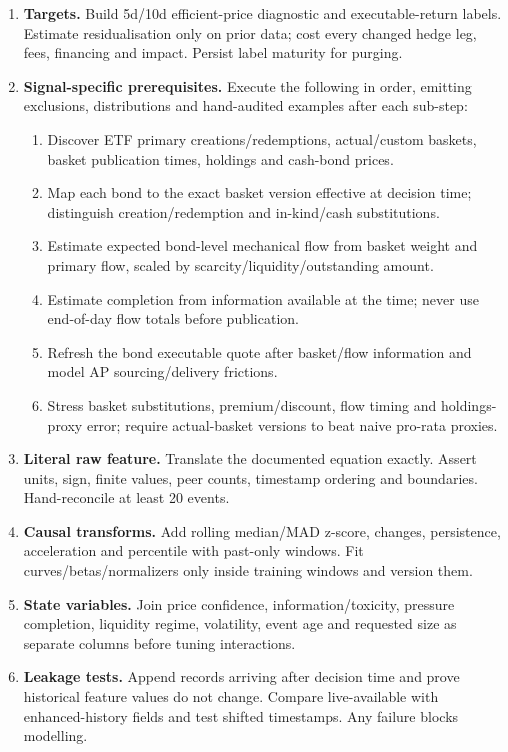 \documentclass[10pt]{article}
\begin{document}
\begin{enumerate}[leftmargin=2em,label=\textbf{A\arabic*.}]
\item \textbf{Targets.} Build 5d/10d efficient-price diagnostic and executable-return labels. Estimate residualisation only on prior data; cost every changed hedge leg, fees, financing and impact. Persist label maturity for purging.
\item \textbf{Signal-specific prerequisites.} Execute the following in order, emitting exclusions, distributions and hand-audited examples after each sub-step:
\begin{enumerate}[label=\alph*)]
\item Discover ETF primary creations/redemptions, actual/custom baskets, basket publication times, holdings and cash-bond prices.
\item Map each bond to the exact basket version effective at decision time; distinguish creation/redemption and in-kind/cash substitutions.
\item Estimate expected bond-level mechanical flow from basket weight and primary flow, scaled by scarcity/liquidity/outstanding amount.
\item Estimate completion from information available at the time; never use end-of-day flow totals before publication.
\item Refresh the bond executable quote after basket/flow information and model AP sourcing/delivery frictions.
\item Stress basket substitutions, premium/discount, flow timing and holdings-proxy error; require actual-basket versions to beat naive pro-rata proxies.
\end{enumerate}
\item \textbf{Literal raw feature.} Translate the documented equation exactly. Assert units, sign, finite values, peer counts, timestamp ordering and boundaries. Hand-reconcile at least 20 events.
\item \textbf{Causal transforms.} Add rolling median/MAD z-score, changes, persistence, acceleration and percentile with past-only windows. Fit curves/betas/normalizers only inside training windows and version them.
\item \textbf{State variables.} Join price confidence, information/toxicity, pressure completion, liquidity regime, volatility, event age and requested size as separate columns before tuning interactions.
\item \textbf{Leakage tests.} Append records arriving after decision time and prove historical feature values do not change. Compare live-available with enhanced-history fields and test shifted timestamps. Any failure blocks modelling.

\end{enumerate}
\end{document}
